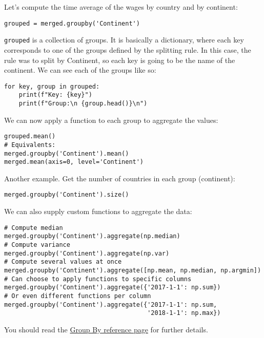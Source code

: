 \documentclass[12pt, a4paper]{article}
\begin{document}
Let's compute the time average of the wages by country and by continent:
\lstset{language=jupyter-python,label= ,caption= ,captionpos=b,numbers=none}
\begin{lstlisting}
grouped = merged.groupby('Continent')
\end{lstlisting}

\texttt{grouped} is a collection of groups.
It is basically a dictionary, where each key corresponds to one of the groups defined by the splitting rule.
In this case, the rule was to split by Continent, so each key is going to be the name of the continent.
We can see each of the groups like so:
\lstset{language=jupyter-python,label= ,caption= ,captionpos=b,numbers=none}
\begin{lstlisting}
for key, group in grouped:
    print(f"Key: {key}")
    print(f"Group:\n {group.head()}\n")
\end{lstlisting}

We can now apply a function to each group to aggregate the values:
\lstset{language=jupyter-python,label= ,caption= ,captionpos=b,numbers=none}
\begin{lstlisting}
grouped.mean()
# Equivalents:
merged.groupby('Continent').mean()
merged.mean(axis=0, level='Continent')
\end{lstlisting}

Another example.
Get the number of countries in each group (continent):
\lstset{language=jupyter-python,label= ,caption= ,captionpos=b,numbers=none}
\begin{lstlisting}
merged.groupby('Continent').size()
\end{lstlisting}

We can also supply custom functions to aggregate the data:
\lstset{language=jupyter-python,label= ,caption= ,captionpos=b,numbers=none}
\begin{lstlisting}
# Compute median
merged.groupby('Continent').aggregate(np.median)
# Compute variance
merged.groupby('Continent').aggregate(np.var)
# Compute several values at once
merged.groupby('Continent').aggregate([np.mean, np.median, np.argmin])
# Can choose to apply functions to specific columns
merged.groupby('Continent').aggregate({'2017-1-1': np.sum})
# Or even different functions per column
merged.groupby('Continent').aggregate({'2017-1-1': np.sum,
                                       '2018-1-1': np.max})
\end{lstlisting}
You should read the \href{https://pandas.pydata.org/pandas-docs/stable/user\_guide/groupby.html\#group-by-split-apply-combine}{Group By reference page} for further details.
\end{document}
